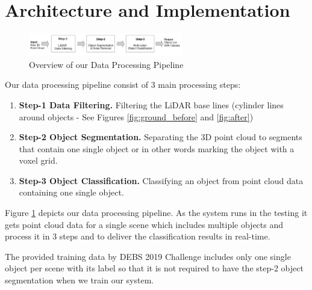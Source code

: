 \section{Architecture and Implementation}\label{sec:Architecture}

\begin{figure}[!ht]
 \begin{center}
   \includegraphics[width=0.6\textwidth]{./images/DataProcessingPipleline.pdf}
   \caption{Overview of our Data Processing Pipeline}
   \label{fig:dataPipeline}
 \end{center}
\end{figure}

Our data processing pipeline consist of 3 main processing steps:

\begin{enumerate}
  \item \textbf{Step-1 Data Filtering. } Filtering the LiDAR base lines (cylinder lines around objects - See Figures \ref{fig:ground_before} and \ref{fig:after})

  \item \textbf{Step-2 Object Segmentation.} Separating the 3D point cloud to segments that contain one single object or in other words marking the object with a voxel grid.

  \item \textbf{Step-3 Object Classification.}  Classifying an object from point cloud data containing one single object.
\end{enumerate}




Figure \ref{fig:dataPipeline} depicts our data processing pipeline. As the system runs in the testing it gets point cloud data for a single scene which includes multiple objects and process it in 3 steps and to deliver the classification results in real-time.

The provided training data by DEBS 2019 Challenge \cite{DEBSGC2019} includes only one single object per scene with its label so that it is not required to have the step-2 object segmentation when we train our system.






